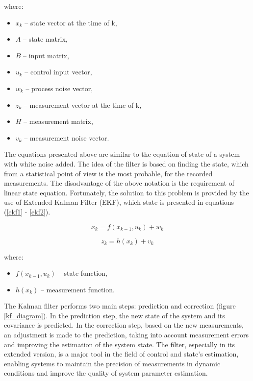 where:
\begin{itemize}[noitemsep]
	\item $x_k$ -- state vector at the time of k, 
	\item $A$ -- state matrix, 
	\item $B$  -- input matrix, 
	\item $u_k$  -- control input vector, 
	\item $w_k$ -- process noise vector, 
	\item $z_k$  -- measurement vector at the time of k, 
	\item $H$ -- measurement matrix,
	\item $v_k$ -- measurement noise vector.
\end{itemize}

The equations presented above are similar to the equation of state of a system with white noise added. The idea of the filter is based on finding the state, which from a statistical point of view is the most probable, for the recorded measurements. The disadvantage of the above notation is the requirement of linear state equation. Fortunately, the solution to this problem is provided by the use of Extended Kalman Filter (EKF), which state is presented in equations (\ref{ekf1} - \ref{ekf2}).

\begin{equation}
	x_k =  f \left( x_{k-1},  u_k \right) + w_k
	\label{ekf1}
\end{equation}

\begin{equation}
	z_k = h \left(x_k \right) + v_k
	\label{ekf2}
\end{equation}


where:
\begin{itemize}
	\item $ f \left( x_{k-1},  u_k \right)$ -- state function, 
	\item $h \left(x_k \right)$ -- measurement function.
\end{itemize}

The Kalman filter performs two main steps: prediction and correction (figure \ref{kf_diagram}). In the prediction step, the new state of the system and its covariance is predicted. In the correction step, based on the new measurements, an adjustment is made to the prediction, taking into account measurement errors and improving the estimation of the system state. The filter, especially in its extended version, is a major tool in the field of control and state's estimation, enabling systems to maintain the precision of measurements in dynamic conditions and improve the quality of system parameter estimation.\\



